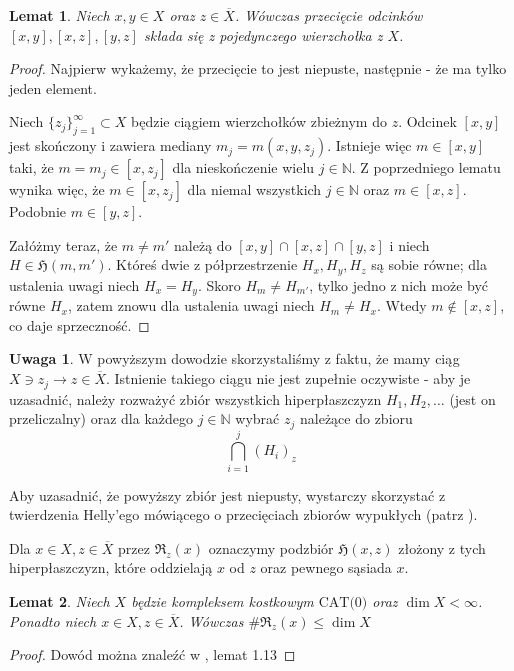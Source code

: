 \documentclass[licencjacka]{pracamgr}
\theoremstyle{definition}
\theoremstyle{definition}
\newtheorem{remark}{Uwaga}[section]
\theoremstyle{definition}
\theoremstyle{definition}
\theoremstyle{definition}
\theoremstyle{plain}
\newtheorem{lemma}{Lemat}[section]
\theoremstyle{plain}
\begin{document}
\begin{lemma}
	Niech $ x,y \in X $ oraz $ z \in \overline{X} $. Wówczas przecięcie odcinków 
	$ [x,y], [x,z], [y,z] $ składa się z pojedynczego wierzchołka z $ X $.
\end{lemma}
\begin{proof}
	Najpierw wykażemy, że przecięcie to jest niepuste, następnie - że ma tylko jeden element.

	Niech $ \{z_j\}_{j = 1}^{\infty} \subset X $ będzie ciągiem wierzchołków zbieżnym 
	do $ z $. Odcinek $[x,y] $ jest skończony i zawiera mediany $ m_j = m(x,y,z_j) $. 
	Istnieje więc $ m \in [x,y] $ taki, że $ m = m_j \in [x,z_j] $ dla nieskończenie 
	wielu $ j \in \mathbb{N} $. Z poprzedniego lematu wynika więc, że $ m \in [x,z_j] $ dla 
	niemal wszystkich $ j \in \mathbb{N} $ oraz $ m \in [x,z] $. Podobnie $ m \in [y,z] $.

	Załóżmy teraz, że $ m \neq m' $ należą do $ [x,y] \cap [x,z] \cap [y,z] $ i niech 
	$ H \in \mathfrak{H}(m,m') $. Któreś dwie z półprzestrzenie $ H_x, H_y, H_z $ są 
	sobie równe; dla ustalenia uwagi niech $ H_x = H_y $. Skoro $ H_m \neq H_{m'} $, 
	tylko jedno z nich może być równe $ H_x $, zatem znowu dla ustalenia uwagi niech 
	$ H_m \neq H_x $. Wtedy $ m \notin [x,z] $, co daje sprzeczność.
\end{proof}

\begin{remark}
	W powyższym dowodzie skorzystaliśmy z faktu, że mamy ciąg $X \ni z_j \rightarrow z \in 
	\overline{X}$. 
	Istnienie takiego ciągu nie jest zupełnie oczywiste - aby je uzasadnić, należy 
	rozważyć zbiór wszystkich hiperpłaszczyzn $ H_1, H_2, \dots $ (jest on przeliczalny) 
	oraz dla każdego $ j \in \mathbb{N}$ wybrać $ z_j $ należące do zbioru
	$$ \bigcap\limits_{i=1}^j (H_i)_z $$
	
	Aby uzasadnić, że powyższy zbiór jest niepusty, wystarczy skorzystać z twierdzenia 
	Helly'ego mówiącego o przecięciach zbiorów wypukłych (patrz \cite{helly}). 
\end{remark}
Dla $ x \in X, z \in \overline{X} $ przez $ \mathfrak{R}_z(x) $ oznaczymy 
podzbiór $ \mathfrak{H}(x,z) $ złożony z tych hiperpłaszczyzn, które oddzielają 
$x $ od $ z $ oraz pewnego sąsiada $ x $. 
\begin{lemma}
	Niech $ X $ będzie kompleksem kostkowym $ \text{CAT(0)} $ oraz $ \dim{X} < \infty $. 
	Ponadto niech $ x \in X, z \in \overline{X} $.
	Wówczas $ \# \mathfrak{R}_z(x) \leq \dim{X}$
\end{lemma}
\begin{proof}
	Dowód można znaleźć w \cite{brodzki}, lemat 1.13
\end{proof}
\end{document}
